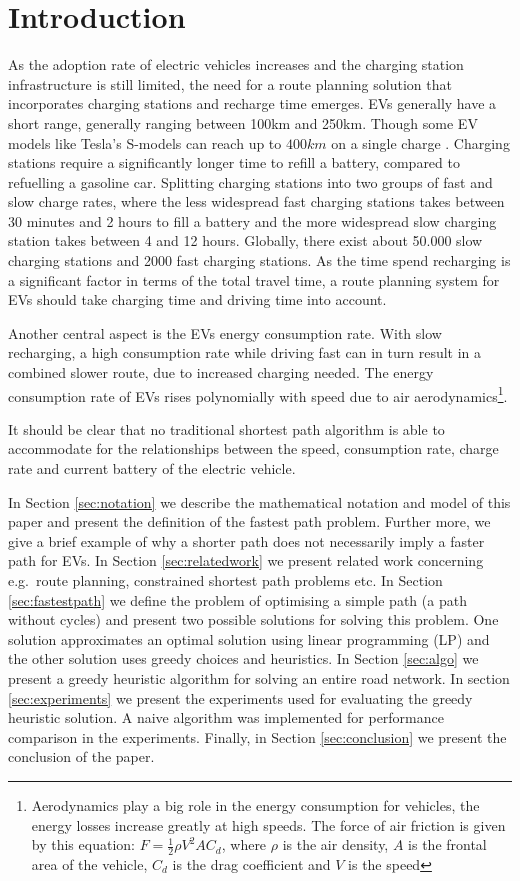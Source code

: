 \section{Introduction}

As the adoption rate of electric vehicles increases \cite{Henry2013} and the charging station infrastructure is still limited, the need for a route planning solution that incorporates charging stations and recharge time emerges. EVs generally have a short range, generally ranging between 100km and 250km. Though some EV models like Tesla's S-models can reach up to $400\si{km}$ on a single charge \cite{teslacon}. Charging stations require a significantly longer time to refill a battery, compared to refuelling a gasoline car. Splitting charging stations into two groups of fast and slow charge rates, where the less widespread fast charging stations takes between 30 minutes and 2 hours to fill a battery and the more widespread slow charging station takes between 4 and 12 hours. Globally, there exist about 50.000 slow charging stations and 2000 fast charging stations\cite{Globalevoutlook}. As the time spend recharging is a significant factor in terms of the total travel time, a route planning system for EVs should take charging time and driving time into account.

Another central aspect is the EVs energy consumption rate. With slow recharging, a high consumption rate while driving fast can in turn result in a combined slower route, due to increased charging needed. The energy consumption rate of EVs rises polynomially with speed due to air aerodynamics\footnote{Aerodynamics play a big role in the energy consumption for vehicles, the energy losses increase greatly at high speeds. The force of air friction is given by this equation: $F = \frac{1}{2} \rho V^2 A C_d$, where $\rho$ is the air density, $A$ is the frontal area of the vehicle, $C_d$ is the drag coefficient and $V$ is the speed}.

It should be clear that no traditional shortest path algorithm is able to accommodate for the relationships between the speed, consumption rate, charge rate and current battery of the electric vehicle. 

In Section \ref{sec:notation} we describe the mathematical notation and model of this paper and present the definition of the fastest path problem. Further more, we give a brief example of why a shorter path does not necessarily imply a faster path for EVs. In Section \ref{sec:relatedwork} we present related work concerning e.g.\ route planning, constrained shortest path problems etc. In Section \ref{sec:fastestpath} we define the problem of optimising a simple path (a path without cycles) and present two possible solutions for solving this problem. One solution approximates an optimal solution using linear programming (LP) and the other solution uses greedy choices and heuristics. In Section \ref{sec:algo} we present a greedy heuristic algorithm for solving an entire road network. In section \ref{sec:experiments} we present the experiments used for evaluating the greedy heuristic solution. A naive algorithm was implemented for performance comparison in the experiments. Finally, in Section \ref{sec:conclusion} we present the conclusion of the paper.    